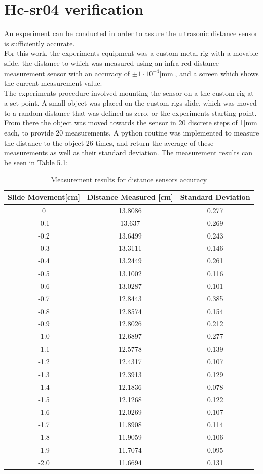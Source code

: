 \documentclass[twoside]{ctuthesis}
\theoremstyle{plain}
\theoremstyle{definition}
\theoremstyle{note}
\begin{document}
\section{Hc-sr04 verification}
An experiment can be conducted in order to assure the ultrasonic distance sensor is sufficiently accurate.\\ 
For this work, the experiments equipment was a custom metal rig with a movable slide, the distance to which was measured using an infra-red distance measurement sensor with an accuracy of $\pm1\cdot10^{-4}$[mm], and a screen which shows the current measurement value.\\
The experiments procedure involved mounting the sensor on a the custom rig at a set point. A small object was placed on the custom rigs slide, which was moved to a random distance that was defined as zero, or the experiments starting point. From there the object was moved towards the sensor in 20 discrete steps of 1[mm] each, to provide 20 measurements. A python routine was implemented to measure the distance to the object 26 times, and return the average of these measurements as well as their standard deviation. The measurement results can be seen in Table 5.1:


\begin{table}[H]
\centering
	\begin{tabular}{| c |c| c |}
		\hline
		Slide Movement[cm] & Distance Measured [cm] & Standard Deviation\\ \hline
		0 & 13.8086 & 0.277\\
		-0.1 & 13.637 & 0.269\\
		-0.2 & 13.6499 & 0.243\\
		-0.3 & 13.3111 & 0.146\\
		-0.4 & 13.2449 & 0.261\\
		-0.5 & 13.1002 & 0.116\\
		-0.6 & 13.0287 & 0.101\\
		-0.7 & 12.8443 & 0.385\\
		-0.8 & 12.8574 & 0.154\\
		-0.9 & 12.8026 & 0.212\\
		-1.0 & 12.6897 & 0.277\\
		-1.1 & 12.5778 & 0.139\\
		-1.2 & 12.4317 & 0.107\\
		-1.3 & 12.3913 & 0.129\\
		-1.4 & 12.1836 & 0.078\\
		-1.5 & 12.1268 & 0.122\\
		-1.6 & 12.0269 & 0.107\\
		-1.7 & 11.8908 & 0.114\\
		-1.8 & 11.9059 & 0.106\\
		-1.9 & 11.7074 & 0.095\\
		-2.0 & 11.6694 & 0.131\\
		\hline
	\end{tabular}
	\caption{Measurement results for distance sensors accuracy}
\end{table}
\end{document}

